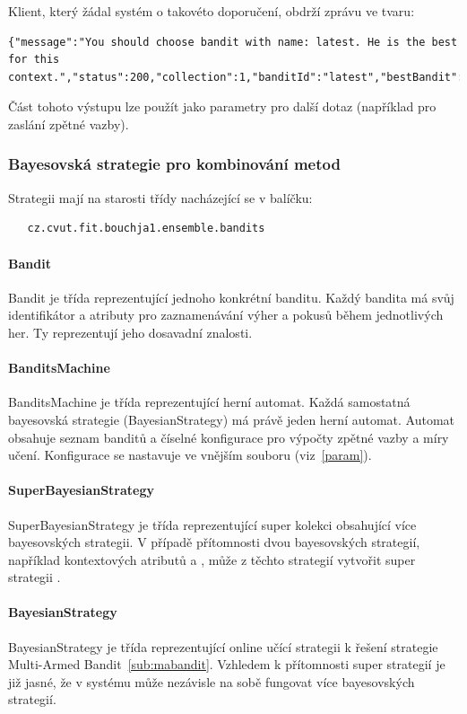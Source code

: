 \documentclass[thesis=M,czech]{FITthesis}[2014/05/07]
\begin{document}
Klient, který žádal systém o takovéto doporučení, obdrží zprávu ve tvaru:

\begin{lstlisting}
{"message":"You should choose bandit with name: latest. He is the best for this context.","status":200,"collection":1,"banditId":"latest","bestBandit":2}
\end{lstlisting}

Část tohoto výstupu lze použít jako parametry pro další dotaz (například pro zaslání zpětné vazby).

\subsubsection{Bayesovská strategie pro kombinování metod}

Strategii mají na starosti třídy nacházející se v balíčku:

\begin{verbatim}
   cz.cvut.fit.bouchja1.ensemble.bandits
\end{verbatim}

\paragraph{Bandit}
Bandit je třída reprezentující jednoho konkrétní banditu. Každý bandita má svůj identifikátor a atributy pro zaznamenávání výher a pokusů během jednotlivých her. Ty reprezentují jeho dosavadní znalosti.
\paragraph{BanditsMachine}
BanditsMachine je třída reprezentující herní automat. Každá samostatná bayesovská strategie (BayesianStrategy) má právě jeden herní automat. Automat obsahuje seznam banditů a číselné konfigurace pro výpočty zpětné vazby a míry učení. Konfigurace se nastavuje ve vnějším souboru (viz~\ref{param}).
\paragraph{SuperBayesianStrategy} SuperBayesianStrategy je třída reprezentující super kolekci obsahující více bayesovských strategii. V případě přítomnosti dvou bayesovských strategií, například kontextových atributů  a , může z těchto strategií vytvořit super strategii .
\paragraph{BayesianStrategy}	BayesianStrategy je třída reprezentující online učící strategii k řešení strategie Multi-Armed Bandit~\ref{sub:mabandit}. Vzhledem k přítomnosti super strategií je již jasné, že v systému může nezávisle na sobě fungovat více bayesovských strategií. 
\end{document}

